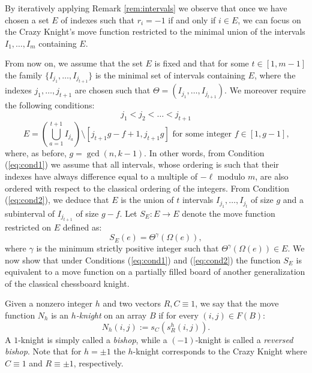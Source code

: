 \documentclass{amsart}
\theoremstyle{definition}
\numberwithin{equation}{section}
\begin{document}
By iteratively applying Remark \ref{rem:intervals} we observe that once we have chosen a set $E$ of indexes such that $r_i=-1$ if and only if $i \in E$, we can focus on the Crazy Knight's move function restricted to the minimal union of the intervals $I_1,\dotsc,I_m$ containing $E$. 

From now on, we assume that the set $E$ is fixed and that for some $t \in [1,m-1]$ the family $\{I_{j_1}, \dotsc, I_{j_{t+1}}\}$ is the minimal set of intervals containing $E$, where the indexes $j_1,\dotsc,j_{t+1}$ are chosen such that $\Theta = (I_{j_1}, \dotsc, I_{j_{t+1}})$.
We moreover require the following conditions: 
\begin{equation}\label{eq:cond1}
    j_1 < j_2 < \dotsc < j_{t+1} 
\end{equation}
\begin{equation} \label{eq:cond2}
\text{$E = \left(\bigcup_{a=1}^{t+1} I_{j_a}\right)  \setminus [j_{t+1}g-f+1, j_{t+1}g]$  for some integer $f \in [1,g-1]$,}
\end{equation}
where, as before, $g=\gcd(n,k-1)$.
In other words, from Condition (\ref{eq:cond1}) we assume that all intervals, whose ordering is such that their indexes have always difference equal to a multiple of $-\ell$ modulo $m$, are also ordered with respect to the classical ordering of the integers.  From Condition (\ref{eq:cond2}), we deduce that $E$ is the union of $t$ intervals $I_{j_1}, \dotsc, I_{j_t}$ of size $g$ and a subinterval of $I_{j_{t+1}}$ of size $g-f$. Let $S_E: E \rightarrow E$ denote the move function restricted on $E$ defined as:
\begin{equation}
\label{eq:s_E}
{S_E}(e)= \Theta^\gamma(\Omega(e)),
\end{equation}
where $\gamma$ is the minimum strictly positive integer such that $\Theta^\gamma(\Omega(e)) \in E$. We now show that under Conditions (\ref{eq:cond1}) and (\ref{eq:cond2}) the function $S_E$ is equivalent to a move function on a partially filled board of another generalization of the classical chessboard knight.



Given a nonzero integer $h$ and two vectors $R,C \equiv 1$, we say that the move function $N_h$ is an \textit{$h$-knight}  on an array $B$ if for every $(i,j)\in F(B)$:
\[
N_h(i,j) := s_C(s_R^h(i,j)).
\]
A $1$-knight is simply called a \textit{bishop}, while a $(-1)$-knight is called a \textit{reversed bishop}. Note that for $h = \pm 1$ the $h$-knight corresponds to the Crazy Knight where $C \equiv 1$ and $R \equiv \pm 1$, respectively.
\end{document}
